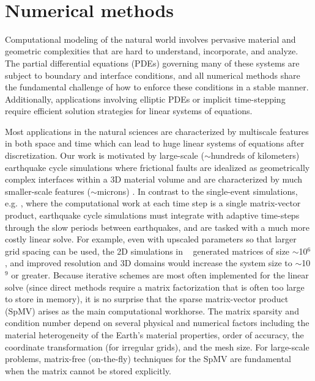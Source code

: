 ~\\
\section{Numerical methods}
Computational modeling of the natural world involves pervasive material and
geometric complexities that are hard to understand, incorporate, and analyze.
%
The partial differential equations (PDEs) governing many of these systems are
subject to boundary and interface conditions, and all numerical methods share
the fundamental challenge of how to enforce these conditions in a stable manner.
Additionally, applications involving elliptic PDEs or implicit time-stepping require efficient solution strategies for linear systems of equations. 


Most applications in the natural sciences are characterized by multiscale features in both space and time which can lead to huge linear systems of equations after discretization. Our work is motivated by large-scale ($\sim$hundreds of kilometers) earthquake cycle simulations where frictional faults are idealized as geometrically complex interfaces within a 3D material volume and are characterized by much smaller-scale features ($\sim$microns) \cite{Erickson2014, Kozdon2012InteractionOW}. In contrast to the single-event simulations, e.g. \cite{Roten}, where the computational work at each time step is a single matrix-vector product, earthquake cycle simulations must integrate with adaptive time-steps through the slow periods between earthquakes, and are tasked with a much more costly linear solve.  For example, even with upscaled parameters so that larger grid spacing can be
used, the 2D simulations in ~\cite{Erickson2014} generated matrices of size
$\sim$10$^6$, and improved resolution and 3D domains would increase the system
size to $\sim$10$^9$ or greater.
Because iterative schemes are most often implemented for the linear solve (since direct methods require a matrix factorization that is often too large to store in memory), it is no surprise that the sparse matrix-vector product (SpMV) arises as the main computational workhorse. The matrix sparsity and condition number depend on several physical and numerical factors including the material heterogeneity of the Earth’s material properties, order of accuracy, the coordinate transformation (for irregular grids), and the mesh size.  For large-scale problems, matrix-free (on-the-fly) techniques for the SpMV are fundamental when the matrix cannot be stored explicitly.

